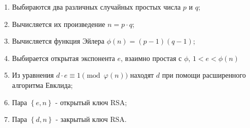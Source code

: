\begin{enumerate}
    \item Выбираются два различных случайных простых числа $p$ и $q$;
    \item Вычисляется их произведение $n = p \cdot q$;
    \item Вычисляется функция Эйлера $\phi(n) = (p-1)(q-1)$;
    \item Выбирается открытая экспонента $e$, взаимно простая с $\phi$, $1 < e < \phi(n)$
    \item Из уравнения $d\cdot e\equiv 1{\pmod {\varphi (n)}} $ находят $d$ при помощи
     расширенного алгоритма Евклида;
    \item Пара $\left\{e,n\right\}$ \-- открытый ключ RSA;
    \item Пара $\left\{d,n\right\}$ \-- закрытый ключ RSA.
\end{enumerate}